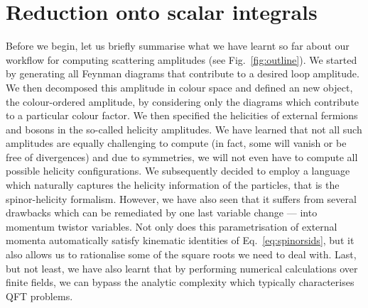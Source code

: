 \documentclass[main.tex]{subfiles}
\begin{document}
\section{Reduction onto scalar integrals} \label{sec:reduction}
Before we begin, let us briefly summarise what we have learnt so far about our workflow for computing scattering amplitudes (see Fig.~\ref{fig:outline}). We started by generating all Feynman diagrams that contribute to a desired loop amplitude. We then decomposed this amplitude in colour space and defined an new object, the colour-ordered amplitude, by considering only the diagrams which contribute to a particular colour factor. We then specified the helicities of external fermions and bosons in the so-called helicity amplitudes. We have learned that not all such amplitudes are equally challenging to compute (in fact, some will vanish or be free of divergences) and due to symmetries, we will not even have to compute all possible helicity configurations. We subsequently decided to employ a language which naturally captures the helicity information of the particles, that is the spinor-helicity formalism. However, we have also seen that it suffers from several drawbacks which can be remediated by one last variable change --- into momentum twistor variables. Not only does this parametrisation of external momenta automatically satisfy kinematic identities of Eq.~\ref{eq:spinorsids}, but it also allows us to rationalise some of the square roots we need to deal with. Last, but not least, we have also learnt that by performing numerical calculations over finite fields, we can bypass the analytic complexity which typically characterises QFT problems.
\end{document}
